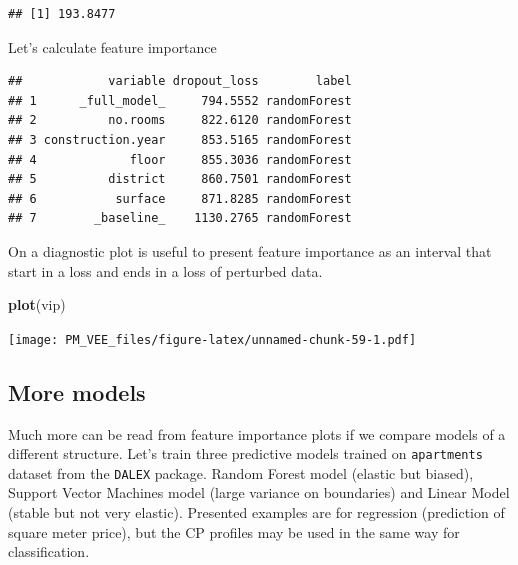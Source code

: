 \documentclass[12pt,]{krantz}
\newenvironment{Shaded}{\begin{snugshade}}{\end{snugshade}}
\newcommand{\DataTypeTok}[1]{\textcolor[rgb]{0.13,0.29,0.53}{#1}}
\newcommand{\DecValTok}[1]{\textcolor[rgb]{0.00,0.00,0.81}{#1}}
\newcommand{\KeywordTok}[1]{\textcolor[rgb]{0.13,0.29,0.53}{\textbf{#1}}}
\newcommand{\NormalTok}[1]{#1}
\newcommand{\OperatorTok}[1]{\textcolor[rgb]{0.81,0.36,0.00}{\textbf{#1}}}
\newcommand{\StringTok}[1]{\textcolor[rgb]{0.31,0.60,0.02}{#1}}
\theoremstyle{definition}
\theoremstyle{definition}
\theoremstyle{definition}
\theoremstyle{remark}
\begin{document}
\begin{verbatim}
## [1] 193.8477
\end{verbatim}

Let's calculate feature importance

\begin{Shaded}
\end{Shaded}

\begin{verbatim}
##            variable dropout_loss        label
## 1      _full_model_     794.5552 randomForest
## 2          no.rooms     822.6120 randomForest
## 3 construction.year     853.5165 randomForest
## 4             floor     855.3036 randomForest
## 5          district     860.7501 randomForest
## 6           surface     871.8285 randomForest
## 7        _baseline_    1130.2765 randomForest
\end{verbatim}

On a diagnostic plot is useful to present feature importance as an
interval that start in a loss and ends in a loss of perturbed data.

\begin{Shaded}
\begin{Highlighting}[]
\KeywordTok{plot}\NormalTok{(vip)}
\end{Highlighting}
\end{Shaded}

\texttt{[image: PM\_VEE\_files/figure-latex/unnamed-chunk-59-1.pdf]}

\hypertarget{more-models}{%
\subsection{More models}\label{more-models}}

Much more can be read from feature importance plots if we compare models
of a different structure. Let's train three predictive models trained on
\texttt{apartments} dataset from the \texttt{DALEX} package. Random
Forest model \citep{R-randomForest} (elastic but biased), Support Vector
Machines model \citep{R-e1071} (large variance on boundaries) and Linear
Model (stable but not very elastic). Presented examples are for
regression (prediction of square meter price), but the CP profiles may
be used in the same way for classification.
\end{document}
